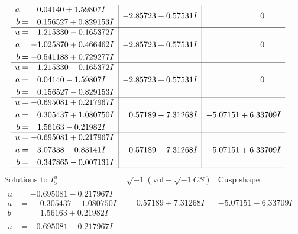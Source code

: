 \documentclass[1p]{elsarticle_modified}
\theoremstyle{definition}
\newcommand{\I}{\sqrt{-1}}
\begin{document}
$$\begin{array}{c|c|c}
\begin{aligned}
a &= \phantom{-}0.04140 + 1.59807 I \\
b &= \phantom{-}0.156527 + 0.829153 I\end{aligned}
 & -2.85723 - 0.57531 I & \phantom{-0.000000 } 0 \\ \hline\begin{aligned}
u &= \phantom{-}1.215330 - 0.165372 I \\
a &= -1.025870 + 0.466462 I \\
b &= -0.541188 + 0.729277 I\end{aligned}
 & -2.85723 + 0.57531 I & \phantom{-0.000000 } 0 \\ \hline\begin{aligned}
u &= \phantom{-}1.215330 - 0.165372 I \\
a &= \phantom{-}0.04140 - 1.59807 I \\
b &= \phantom{-}0.156527 - 0.829153 I\end{aligned}
 & -2.85723 + 0.57531 I & \phantom{-0.000000 } 0 \\ \hline\begin{aligned}
u &= -0.695081 + 0.217967 I \\
a &= \phantom{-}0.305437 + 1.080750 I \\
b &= \phantom{-}1.56163 - 0.21982 I\end{aligned}
 & \phantom{-}0.57189 - 7.31268 I & -5.07151 + 6.33709 I \\ \hline\begin{aligned}
u &= -0.695081 + 0.217967 I \\
a &= \phantom{-}3.07338 - 0.83141 I \\
b &= \phantom{-}0.347865 - 0.007131 I\end{aligned}
 & \phantom{-}0.57189 - 7.31268 I & -5.07151 + 6.33709 I\\
 \hline 
 \end{array}$$\newpage$$\begin{array}{c|c|c}  
\text{Solutions to }I^u_{5}& \I (\text{vol} + \sqrt{-1}CS) & \text{Cusp shape}\\
 \hline 
\begin{aligned}
u &= -0.695081 - 0.217967 I \\
a &= \phantom{-}0.305437 - 1.080750 I \\
b &= \phantom{-}1.56163 + 0.21982 I\end{aligned}
 & \phantom{-}0.57189 + 7.31268 I & -5.07151 - 6.33709 I \\ \hline\begin{aligned}
u &= -0.695081 - 0.217967 I \\

\end{aligned}
\end{array}$$
\end{document}
